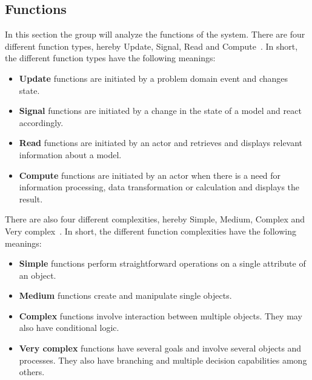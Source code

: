 \subsection{Functions}\label{subsec:functions}

In this section the group will analyze the functions of the system.
There are four different function types, hereby Update, Signal, Read and Compute~\cite{mathiassen2018}.
In short, the different function types have the following meanings:

\begin{itemize}
    \item \textbf{Update} functions are initiated by a problem domain event and changes state.

    \item \textbf{Signal} functions are initiated by a change in the state of a model and react accordingly.

    \item \textbf{Read} functions are initiated by an actor and retrieves and displays relevant information about a
    model.

    \item \textbf{Compute} functions are initiated by an actor when there is a need for information processing, data
    transformation or calculation and displays the result.
\end{itemize}

There are also four different complexities, hereby Simple, Medium, Complex and Very complex~\cite{mathiassen2018}.
In short, the different function complexities have the following meanings:

\begin{itemize}
    \item \textbf{Simple} functions perform straightforward operations on a single attribute of an object.

    \item \textbf{Medium} functions create and manipulate single objects.

    \item \textbf{Complex} functions involve interaction between multiple objects.
    They may also have conditional logic.

    \item \textbf{Very complex} functions have several goals and involve several objects and processes.
    They also have branching and multiple decision capabilities among others.
\end{itemize}


